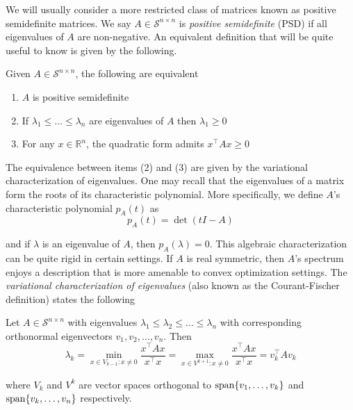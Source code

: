 We will usually consider a more restricted class of matrices known as positive semidefinite matrices. We say $A \in \mathcal{S}^{n \times n}$ is \emph{positive semidefinite} (PSD) if all eigenvalues of $A$ are non-negative. An equivalent definition that will be quite useful to know is given by the following.
\begin{theorem}\label{thm:psd-matrices}
Given $A \in \mathcal{S}^{n \times n}$, the following are equivalent
\vspace{-1em}
\begin{enumerate}
\item $A$ is positive semidefinite

\item If $\lambda_1 \leq \ldots \leq \lambda_n$ are eigenvalues of $A$ then $\lambda_1 \geq 0$

\item For any $x \in \mathbb{R}^n$, the quadratic form admits $x^\top Ax \geq 0$
\end{enumerate}
\end{theorem}

The equivalence between items (2) and (3) are given by the variational characterization of eigenvalues. One may recall that the eigenvalues of a matrix form the roots of its characteristic polynomial. More specifically, we define $A$'s characteristic polynomial $p_A(t)$ as
\begin{equation*}
p_A(t) = \det (tI - A)
\end{equation*}

and if $\lambda$ is an eigenvalue of $A$, then $p_A(\lambda) = 0$. This algebraic characterization can be quite rigid in certain settings. If $A$ is real symmetric, then $A$'s spectrum enjoys a description that is more amenable to convex optimization settings. The \emph{variational characterization of eigenvalues} (also known as the Courant-Fischer definition) states the following

\begin{theorem}
Let $A \in \mathcal{S}^{n \times n}$ with eigenvalues $\lambda_1 \leq \lambda_2 \leq \ldots \leq \lambda_n$ with corresponding orthonormal eigenvectors $v_1, v_2, \ldots, v_n$. Then
\begin{equation*}
\lambda_k
= \min_{x \in V_{k-1}: x \neq 0} \frac{x^\top Ax}{x^\top x}
= \max_{x \in V^{k+1}: x \neq 0} \frac{x^\top Ax}{x^\top x}
= v_k^\top Av_k
\end{equation*}

where $V_k$ and $V^k$ are vector spaces orthogonal to $\textup{span} \{ v_1, \ldots, v_k \}$ and $\textup{span} \{ v_k, \ldots, v_n \}$ respectively.
\end{theorem}


